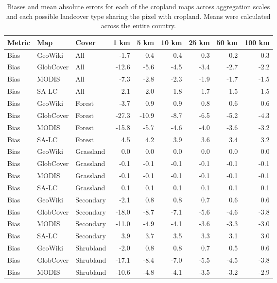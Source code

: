 \begin{longtable}{lllrrrrrr}
\caption{Biases and mean absolute errors for each of the cropland maps across aggregation scales and each possible landcover type sharing the pixel with cropland. Means were calculated across the entire country.} \\ 
  \hline
Metric & Map & Cover & 1 km & 5 km & 10 km & 25 km & 50 km & 100 km \\ 
  \hline
Bias & GeoWiki & All & -1.7 & 0.4 & 0.4 & 0.3 & 0.2 & 0.3 \\ 
  Bias & GlobCover & All & -12.6 & -5.6 & -4.5 & -3.4 & -2.7 & -2.2 \\ 
  Bias & MODIS & All & -7.3 & -2.8 & -2.3 & -1.9 & -1.7 & -1.5 \\ 
  Bias & SA-LC & All & 2.1 & 2.0 & 1.8 & 1.7 & 1.5 & 1.5 \\ 
  Bias & GeoWiki & Forest & -3.7 & 0.9 & 0.9 & 0.8 & 0.6 & 0.6 \\ 
  Bias & GlobCover & Forest & -27.3 & -10.9 & -8.7 & -6.5 & -5.2 & -4.3 \\ 
  Bias & MODIS & Forest & -15.8 & -5.7 & -4.6 & -4.0 & -3.6 & -3.2 \\ 
  Bias & SA-LC & Forest & 4.5 & 4.2 & 3.9 & 3.6 & 3.4 & 3.2 \\ 
  Bias & GeoWiki & Grassland & 0.0 & 0.0 & 0.0 & 0.0 & 0.0 & 0.0 \\ 
  Bias & GlobCover & Grassland & -0.1 & -0.1 & -0.1 & -0.1 & -0.1 & -0.1 \\ 
  Bias & MODIS & Grassland & -0.1 & -0.1 & -0.1 & -0.1 & -0.1 & -0.1 \\ 
  Bias & SA-LC & Grassland & 0.1 & 0.1 & 0.1 & 0.1 & 0.1 & 0.1 \\ 
  Bias & GeoWiki & Secondary & -2.1 & 0.8 & 0.8 & 0.7 & 0.6 & 0.6 \\ 
  Bias & GlobCover & Secondary & -18.0 & -8.7 & -7.1 & -5.6 & -4.6 & -3.8 \\ 
  Bias & MODIS & Secondary & -11.0 & -4.9 & -4.1 & -3.6 & -3.3 & -3.0 \\ 
  Bias & SA-LC & Secondary & 3.9 & 3.7 & 3.5 & 3.3 & 3.1 & 3.0 \\ 
  Bias & GeoWiki & Shrubland & -2.0 & 0.8 & 0.8 & 0.7 & 0.5 & 0.6 \\ 
  Bias & GlobCover & Shrubland & -17.1 & -8.4 & -7.0 & -5.5 & -4.5 & -3.8 \\ 
  Bias & MODIS & Shrubland & -10.6 & -4.8 & -4.1 & -3.5 & -3.2 & -2.9 \\ 

\end{longtable}
